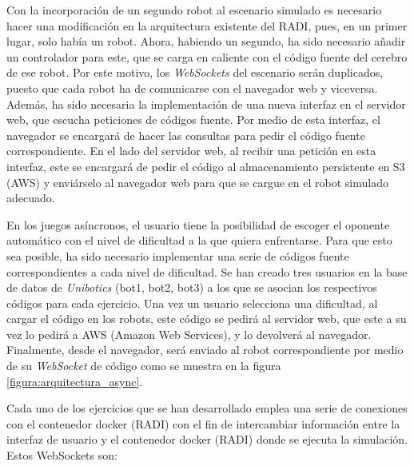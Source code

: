 \documentclass[a4paper, 12pt]{book}
\begin{document}

Con la incorporación de un segundo robot al escenario simulado es necesario hacer una modificación en la arquitectura existente del RADI, pues, en un primer lugar, solo había un robot. Ahora, habiendo un segundo, ha sido necesario añadir un controlador para este, que se carga en caliente con el código fuente del cerebro de ese robot. Por este motivo, los \emph{WebSockets} del escenario serán duplicados, puesto que cada robot ha de comunicarse con el navegador web y viceversa. Además, ha sido necesaria la implementación de una nueva interfaz en el servidor web, que escucha peticiones de códigos fuente. Por medio de esta interfaz, el navegador se encargará de hacer las consultas para pedir el código fuente correspondiente. En el lado del servidor web, al recibir una petición en esta interfaz, este se encargará de pedir el código al almacenamiento persistente en S3 (AWS) y enviárselo al navegador web para que se cargue en el robot simulado adecuado.


En los juegos asíncronos, el usuario tiene la posibilidad de escoger el oponente automático con el nivel de dificultad a la que quiera enfrentarse. Para que esto sea posible, ha sido necesario implementar una serie de códigos fuente correspondientes a cada nivel de dificultad. Se han creado tres usuarios en la base de datos de \emph{Unibotics} (bot1, bot2, bot3) a los que se asocian los respectivos códigos para cada ejercicio. Una vez un usuario selecciona una dificultad, al cargar el código en los robots, este código se pedirá al servidor web, que este a su vez lo pedirá a AWS (Amazon Web Services), y lo devolverá al navegador. Finalmente, desde el navegador, será enviado al robot correspondiente por medio de su \emph{WebSocket} de código como se muestra en la figura \ref{figura:arquitectura_async}.


Cada uno de los ejercicios que se han desarrollado emplea una serie de conexiones con el contenedor docker (RADI) con el fin de intercambiar información entre la interfaz de usuario y el contenedor docker (RADI) donde se ejecuta la simulación. Estos WebSockets son:
\end{document}
